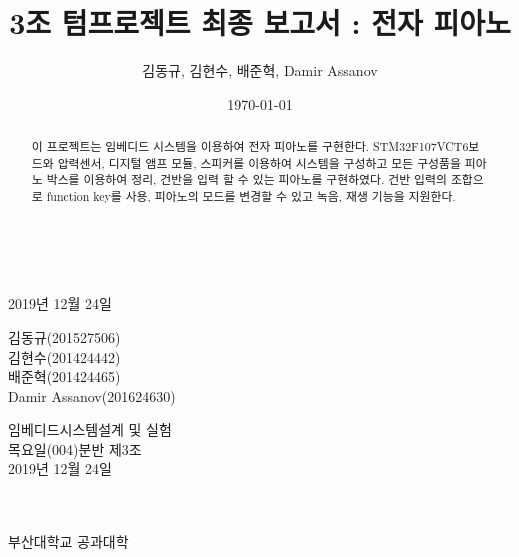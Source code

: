 \documentclass[a4paper,11pt]{article}
\title{\textbf{3조 텀프로젝트 최종 보고서 : 전자 피아노}}
\author{김동규, 김현수, 배준혁, Damir Assanov}
\date{\today}
\makeatletter
\renewcommand\maketitle{
{\raggedright %
\begin{center}
{\fontsize{14}{\baselineskip} \selectfont \@title }\\[1.5cm]
{\fontsize{12}{\baselineskip} \selectfont \@author}\\[1cm]
{부산대학교 공과대학}\\[1.5cm]
\end{center}}} %
\makeatother
\begin{document}
\begin{titlepage}
\vspace{4.5cm}
\makeatletter
\begin{center}
\\[2cm]
{\fontsize{22}{\baselineskip} \selectfont \textbf{\@title}}

\vspace{7cm}

{\fontsize{12}{\baselineskip} \selectfont 2019년 12월 24일}

\vspace{1cm}
\begin{spacing}{1.6}
{\fontsize{16}{\baselineskip} \selectfont 김동규(201527506)}\\
{\fontsize{16}{\baselineskip} \selectfont 김현수(201424442)}\\
{\fontsize{16}{\baselineskip} \selectfont 배준혁(201424465)}\\
{\fontsize{16}{\baselineskip} \selectfont Damir Assanov(201624630)}
\end{spacing}

\vspace*{2cm}

{\fontsize{16}{\baselineskip}  임베디드시스템설계 및 실험\\목요일(004)분반 제3조}\\[2cm]
{\fontsize{16}{\baselineskip} \selectfont 2019년 12월 24일}

\vspace{4cm}

\end{center}
\makeatother
\end{titlepage}
\vspace{3.5cm}
\maketitle
{}
\begin{abstract}
\begin{spacing}{1.6}
  이 프로젝트는 임베디드 시스템을 이용하여 전자 피아노를 구현한다. STM32F107VCT6보드와 압력센서, 디지털 앰프 모듈, 스피커를 이용하여 시스템을 구성하고 모든 구성품을 피아노 박스를 이용하여 정리, 건반을 입력 할 수 있는 피아노를 구현하였다. 건반 입력의 조합으로 function key를 사용, 피아노의 모드를 변경할 수 있고 녹음, 재생 기능을 지원한다.

\end{spacing}
\end{abstract}
\end{document}
